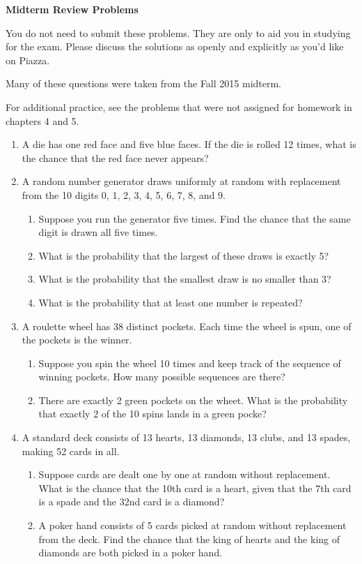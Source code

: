 \documentclass[11pt]{article}
\begin{document}
\centerline{\textbf{Midterm Review Problems}}
You do not need to submit these problems. They are only to aid you in studying for the exam. Please discuss the solutions as openly and explicitly as you'd like on Piazza.

Many of these questions were taken from the Fall 2015 midterm.

For additional practice, see the problems that were not assigned for homework in chapters 4 and 5.

\begin{enumerate}
    \item A die has one red face and five blue faces. If the die is rolled 12 times, what is the chance that the red face never appears?

    \item A random number generator draws uniformly at random with replacement from the 10 digits 0, 1, 2, 3, 4, 5, 6, 7, 8, and 9. 
        \begin{enumerate}
            \item Suppose you run the generator five times. Find the chance that the same digit is drawn all five times.
            \item What is the probability that the largest of these draws is exactly 5?
            \item What is the probability that the smallest draw is no smaller than 3?
            \item What is the probability that at least one number is repeated?
        \end{enumerate}

    \item A roulette wheel has 38 distinct pockets. Each time the wheel is spun, one of the pockets is the winner. 
        \begin{enumerate}
            \item Suppose you spin the wheel 10 times and keep track of the sequence of winning pockets. How many possible sequences are there?
            \item There are exactly 2 green pockets on the wheet. What is the probability that exactly 2 of the 10 spins lands in a green pocke?
        \end{enumerate}

    \item A standard deck consists of 13 hearts, 13 diamonds, 13 clubs, and 13 spades, making 52 cards in all. 

        \begin{enumerate}
            \item Suppose cards are dealt one by one at random without replacement.
    What is the chance that the 10th card is a heart, given that the 7th card is a spade and the 32nd card is a diamond?
            \item A poker hand consists of 5 cards picked at random without replacement from the deck. 
    Find the chance that the king of hearts and the king
    of diamonds are both picked in a poker hand.
        \end{enumerate}


\end{enumerate}
\end{document}

